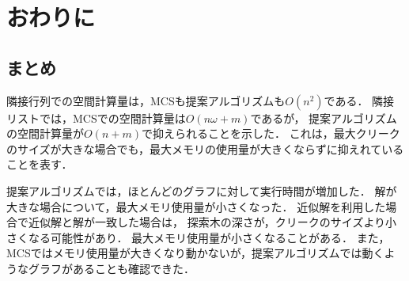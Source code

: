 \chapter{おわりに}
\label{ch:cncls}
\section{まとめ}
隣接行列での空間計算量は，MCSも提案アルゴリズムも$O(n^2)$である．
隣接リストでは，MCSでの空間計算量は$O(n \omega + m )$であるが，
提案アルゴリズムの空間計算量が$O(n+ m)$で抑えられることを示した．
これは，最大クリークのサイズが大きな場合でも，最大メモリの使用量が大きくならずに抑えれていることを表す．

提案アルゴリズムでは，ほとんどのグラフに対して実行時間が増加した．
解が大きな場合について，最大メモリ使用量が小さくなった．
近似解を利用した場合で近似解と解が一致した場合は，
探索木の深さが，クリークのサイズより小さくなる可能性があり．
最大メモリ使用量が小さくなることがある．
また，MCSではメモリ使用量が大きくなり動かないが，提案アルゴリズムでは動くようなグラフがあることも確認できた．


\begin{comment}
\begin{table}[htb]
\centering
\caption{アルゴリズムの空間計算量}
\label{tab:result-mem}
    \begin{tabular}{|l|l|l|}
\hline
 & MCSアルゴリズム &  提案アルゴリズム   \\ \hline
隣接行列 & $O(n^2)$ & $O(n^2)$  \\ \hline
隣接リスト & $O(n \omega +m )$ & $ O(n + m ) $   \\ \hline

\end{tabular}
\small{  $n$はグラフのサイズ$|V|$，$m$はグラフの辺の数$|E|$，$w$はグラフの最大クリークのサイズ }
\end{table}
\end{comment}

